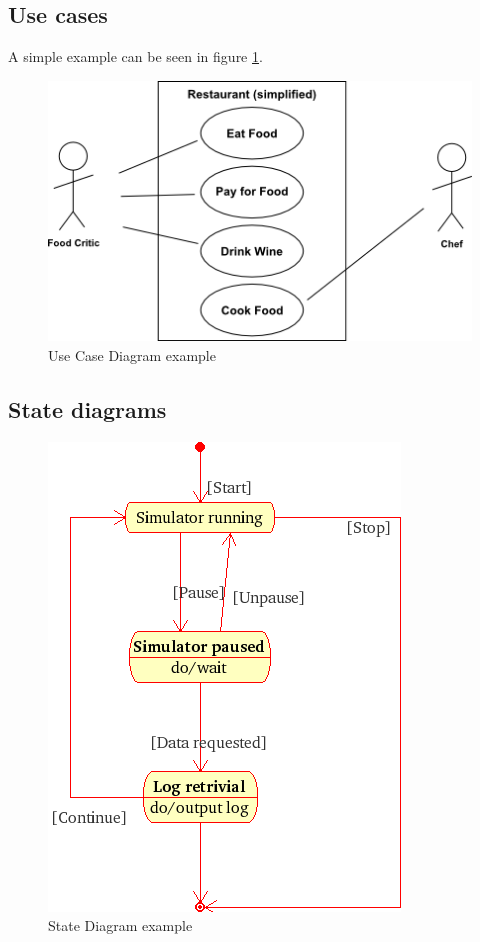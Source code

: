 \documentclass[10pt,a4paper]{article}
\begin{document}
\subsection{Use cases}
A simple example can be seen in figure \ref{fig:use_case_diagram_example}.
\begin{figure}[h]
\centering
\includegraphics[scale=0.6]{fig/UML_Use_Case_diagram.png} 
\caption{Use Case Diagram example}
\label{fig:use_case_diagram_example}
\end{figure}

\subsection{State diagrams}
\begin{figure}[h]
\centering
\includegraphics[scale=0.45]{fig/UML_state_diagram.png} 
\caption{State Diagram example}
\label{fig:state_diagram_example}
\end{figure}
\end{document}
